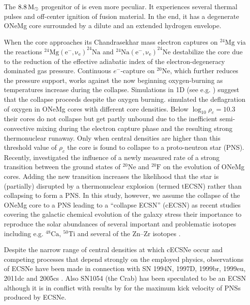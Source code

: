 \documentclass[fleqn,usenatbib]{mnras}
\newcommand{\solm}{\ensuremath{\rm{M_{\odot}}}\xspace}
\begin{document}
The $8.8\, \solm$ progenitor of \cite{Nomoto1984} is even more peculiar. 
It experiences  several thermal pulses and off-center ignition of 
fusion material. In the end, it has a degenerate ONeMg core 
surrounded by a dilute and an extended hydrogen envelope.
 
When the core approaches its Chandrasekhar mass electron captures 
on $\mathrm{^{24}Mg}$ via the reactions 
$\mathrm{^{24}Mg(e^-,\nu_e)}^{24}\mathrm{Na}$ and 
$\mathrm{^{24}Na(e^-,\nu_e)}^{24}\mathrm{Ne}$ \cite{Miyaji1980} 
destabilize the core due to the reduction of the effective 
adiabatic index of the electron-degeneracy dominated gas pressure. 
Continuous $e^-$-capture on $\mathrm{^{20}Ne}$, which further 
reduces the pressure support, works against the now beginning 
oxygen-burning as temperatures increase during the collapse. 
Simulations in 1D (see e.g. \citealt{Kitaura2006,Janka2008,Fischer2010}) 
suggest that the collapse proceeds despite the oxygen burning. 
\cite{Jones2016} simulated the deflagration of oxygen in ONeMg 
cores with different core densities. Below $\log_{10}\rho_c=10.3$ 
their cores do not collapse but get partly unbound due to the inefficient 
semi-convective mixing during the electron capture phase and the 
resulting strong thermonuclear runaway. Only when central densities 
are higher than this threshold value of $\rho_c$ the core is 
found to collapse to a proto-neutron star (PNS).
Recently, \cite{Kirsebom2019} investigated the influence of a newly 
measured rate of a strong transition between the ground states of 
$^{20}\mathrm{Ne}$ and $^{20}\mathrm{F}$ on the evolution of ONeMg 
cores. Adding the new transition increases the likelihood that the 
star is (partially) disrupted by a thermonuclear explosion (termed tECSN) 
rather than collapsing to form a PNS. 
In this study, however, we assume the collapse of the ONeMg core to a 
PNS leading to a ``collapse ECSN'' (cECSN) as recent studies 
covering the galactic chemical evolution of the galaxy stress 
their importance to reproduce the solar abundances of several 
important and problematic isotopes including e.g. 
$\mathrm{^{48}Ca}$, $\mathrm{^{50}Ti}$ and several of the 
$\mathrm{Zn}–\mathrm{Zr}$ isotopes \cite{Jones2019}.

Despite the narrow range of central densities at which 
cECSNe occur \cite{Leung2019} and competing processes that 
depend strongly on the employed physics, observations of 
ECSNe have been made in connection with SN 1994N, 1997D, 
1999br, 1999eu, 2011dc and 2005cs \citep{Stevenson2014}. Also 
SN1054 (the Crab) has been speculated to be an ECSN although it 
is in conflict with results by \cite{Gessner2018} for the maximum 
kick velocity of PNSs produced by ECSNe.
\end{document}
